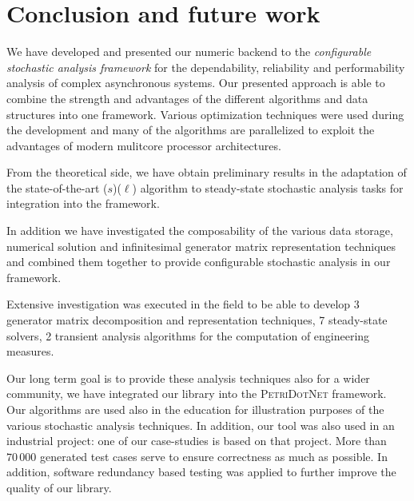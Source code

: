 \chapter{Conclusion and future work}
\label{chap:conclusion}

We have developed and presented our numeric backend to the
\emph{configurable stochastic analysis framework} for the
dependability, reliability and performability analysis of complex
asynchronous systems.  Our presented approach is able to combine the
strength and advantages of the different algorithms and data
structures into one framework. Various optimization techniques were
used during the development and many of the algorithms are
parallelized to exploit the advantages of modern mulitcore processor
architectures.

From the theoretical side, we have obtain preliminary results in the
adaptation of the state-of-the-art
($s$)($\ell$) algorithm to steady-state
stochastic analysis tasks for integration into the framework.

In addition we have investigated the composability of the various data
storage, numerical solution and infinitesimal generator matrix
representation techniques and combined them together to provide
configurable stochastic analysis in our framework.

Extensive investigation was executed in the field to be able to
develop 3 generator matrix decomposition and representation
techniques, 7 steady-state solvers, 2 transient analysis algorithms
for the computation of engineering measures.

Our long term goal is to provide these analysis techniques also for a
wider community, we have integrated our library into the
\textsc{PetriDotNet} framework. Our algorithms are used also in the
education for illustration purposes of the various stochastic analysis
techniques. In addition, our tool was also used in an industrial
project: one of our case-studies is based on that project. More than
$70\,000$ generated test cases serve to ensure correctness as much as
possible. In addition, software redundancy based testing was applied
to further improve the quality of our library.

\needspace{5ex}

